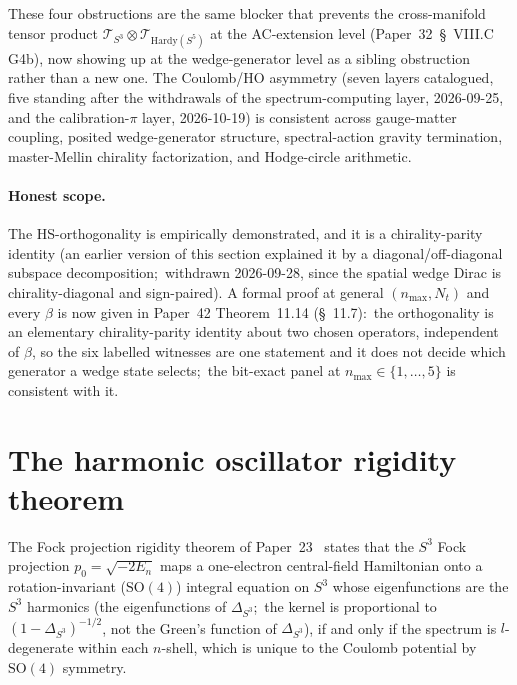 \documentclass[twocolumn,pra,amsmath,amssymb,superscriptaddress]{revtex4-2}
\begin{document}
These four obstructions are the same blocker that prevents the
cross-manifold tensor product $\mathcal{T}_{S^3} \otimes
\mathcal{T}_{\mathrm{Hardy}(S^5)}$ at the AC-extension level
(Paper~32~\S~VIII.C G4b), now showing up at the wedge-generator
level as a sibling obstruction rather than a new one.  The
Coulomb/HO asymmetry (seven layers catalogued, five standing after the
withdrawals of the spectrum-computing layer, 2026-09-25, and the
calibration-$\pi$ layer, 2026-10-19) is consistent across gauge-matter
coupling, posited wedge-generator structure,
spectral-action gravity termination, master-Mellin chirality
factorization, and Hodge-circle arithmetic.

\paragraph{Honest scope.}  The HS-orthogonality is empirically
demonstrated, and it is a chirality-parity identity (an earlier version
of this section explained it by a diagonal/off-diagonal subspace
decomposition;\ withdrawn 2026-09-28, since the spatial wedge Dirac is
chirality-diagonal and sign-paired).  A formal proof at general
$(n_{\max}, N_t)$ and every $\beta$ is now given in Paper~42
Theorem~11.14 (\S~11.7):\ the orthogonality is an elementary
chirality-parity identity about two chosen operators, independent of
$\beta$, so the six labelled witnesses are one statement and it does
not decide which generator a wedge state selects;\ the bit-exact panel
at $n_{\max} \in \{1, \ldots, 5\}$ is consistent with it.

\section{The harmonic oscillator rigidity theorem}
\label{sec:rigidity}

The Fock projection rigidity theorem of Paper~23~\cite{paper23}
states that the $S^3$ Fock projection $p_0 = \sqrt{-2 E_n}$ maps
a one-electron central-field Hamiltonian onto a rotation-invariant
($\mathrm{SO}(4)$) integral equation on $S^3$ whose eigenfunctions are
the $S^3$ harmonics (the eigenfunctions of $\Delta_{S^3}$;\ the kernel is
proportional to $(1 - \Delta_{S^3})^{-1/2}$, not the Green's function of
$\Delta_{S^3}$), if and only if the spectrum is $l$-degenerate within each
$n$-shell, which is unique to the Coulomb potential by
$\mathrm{SO}(4)$ symmetry.
\end{document}
